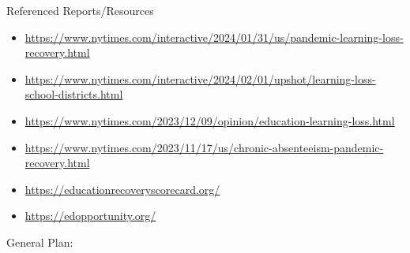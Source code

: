 \documentclass[
  letterpaper,
  DIV=11,
  numbers=noendperiod]{scrartcl}
\begin{document}
Referenced Reports/Resources

\begin{itemize}
\item
  \url{https://www.nytimes.com/interactive/2024/01/31/us/pandemic-learning-loss-recovery.html}
\item
  \href{https://www.nytimes.com/interactive/2024/02/01/upshot/learning-loss-school-districts.html?searchResultPosition=10}{https://www.nytimes.com/interactive/2024/02/01/upshot/learning-loss-school-districts.html}
\item
  \url{https://www.nytimes.com/2023/12/09/opinion/education-learning-loss.html}
\item
  \url{https://www.nytimes.com/2023/11/17/us/chronic-absenteeism-pandemic-recovery.html}
\item
  \url{https://educationrecoveryscorecard.org/}
\item
  \url{https://edopportunity.org/}
\end{itemize}

General Plan:
\end{document}
